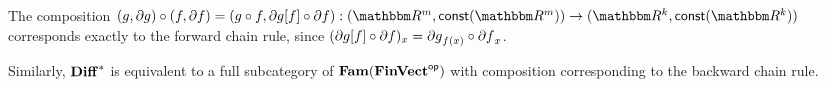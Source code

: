 \noindent The composition $(g, \partial g) \comp (f, \partial f) = (g \comp f, \reindex{\partial g}{f} \comp
\partial f): (\RR^m, \const(\RR^m)) \to (\RR^k, \const(\RR^k))$ corresponds exactly to the forward chain rule,
since $(\partial g[f] \circ \partial f)_x = {\partial g}_{f(x)} \circ {\partial f}_x$.

Similarly, $\mathbf{Diff}^*$ is equivalent to a full subcategory of $\mathbf{Fam}(\mathbf{FinVect}^{\mathsf{op}})$ with composition
corresponding to the backward chain rule.

